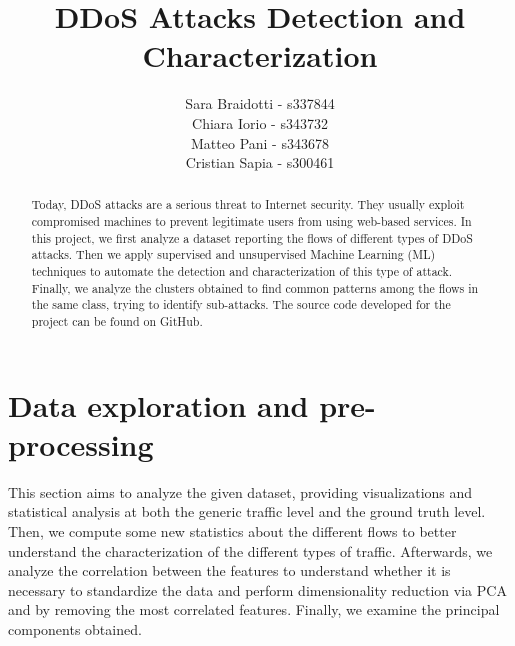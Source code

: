 \documentclass[acmlarge,nonacm]{acmart}
\begin{document}
\title{DDoS Attacks Detection and Characterization}

\author{Sara Braidotti - s337844\\
        Chiara Iorio - s343732\\
        Matteo Pani - s343678\\
        Cristian Sapia - s300461}

\authorsaddresses{}

\renewcommand{\shortauthors}{Braidotti, Iorio, Pani, Sapia}


\begin{abstract}
    Today, DDoS attacks are a serious threat to Internet security. They usually exploit compromised machines to prevent legitimate users from using web-based services. In this project, we first analyze a dataset reporting the flows of different types of DDoS attacks. Then we apply supervised and unsupervised Machine Learning (ML) techniques to automate the detection and characterization of this type of attack. Finally, we analyze the clusters obtained to find common patterns among the flows in the same class, trying to identify sub-attacks. The source code developed for the project can be found on GitHub.~\cite{GitHubRepo}
\end{abstract}

\maketitle

\section{Data exploration and pre-processing}
This section aims to analyze the given dataset, providing visualizations and statistical analysis at both the generic traffic level and the ground truth level. Then, we compute some new statistics about the different flows to better understand the characterization of the different types of traffic. Afterwards, we analyze the correlation between the features to understand whether it is necessary to standardize the data and perform dimensionality reduction via PCA and by removing the most correlated features. Finally, we examine the principal components obtained.
\end{document}
